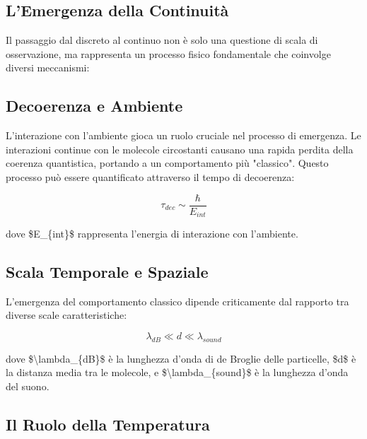 \documentclass[a4paper,11pt]{article}
\begin{document}
\subsection{L'Emergenza della Continuità}\hypertarget{lemergenza-della-continuit}{}\label{lemergenza-della-continuit}

Il passaggio dal discreto al continuo non è solo una questione di scala
di osservazione, ma rappresenta un processo fisico fondamentale che
coinvolge diversi meccanismi:

\subsection{Decoerenza e Ambiente}\hypertarget{decoerenza-e-ambiente}{}\label{decoerenza-e-ambiente}

L'interazione con l'ambiente gioca un ruolo cruciale nel processo di
emergenza. Le interazioni continue con le molecole circostanti causano
una rapida perdita della coerenza quantistica, portando a un
comportamento più "classico". Questo processo può essere quantificato
attraverso il tempo di decoerenza:

\begin{displaymath}
\tau_{dec} \sim \frac{\hbar}{E_{int}}
\end{displaymath}

dove \$E\_\{int\}\$ rappresenta l'energia di interazione con l'ambiente.

\subsection{Scala Temporale e Spaziale}\hypertarget{scala-temporale-e-spaziale}{}\label{scala-temporale-e-spaziale}

L'emergenza del comportamento classico dipende criticamente dal rapporto
tra diverse scale caratteristiche:

\begin{displaymath}
\lambda_{dB} \ll d \ll \lambda_{sound}
\end{displaymath}

dove \$\textbackslash{}lambda\_\{dB\}\$ è la lunghezza d'onda di de Broglie delle
particelle, \$d\$ è la distanza media tra le molecole, e \$\textbackslash{}lambda\_\{sound\}\$
è la lunghezza d'onda del suono.

\subsection{Il Ruolo della Temperatura}\hypertarget{il-ruolo-della-temperatura}{}\label{il-ruolo-della-temperatura}
\end{document}
